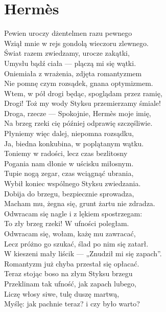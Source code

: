 \documentclass[12pt, a4paper]{memoir}
\renewenvironment{verse}{%
  \par\vspace{\baselineskip}\raggedright
}{
  \par\vspace{\baselineskip}
}
\begin{document}
\newpage
\section{Hermès}
\begin{verse}
Pewien uroczy dżentelmen razu pewnego\\
Wziął mnie w rejs gondolą wieczoru zlewnego.\\
Świat razem zwiedzamy, urocze zakątki,\\
Umysłu bądź ciała --- plączą mi się wątki.\\[\baselineskip]

Oniemiała z wrażenia, zdjęta romantyzmem\\
Nie pomnę czym rozsądek, gnana optymizmem.\\
Wtem, w pół drogi będąc, spoglądam przez ramię,\\
Drogi! Toż my wody Styksu przemierzamy śmiale!\\[\baselineskip]

Droga, rzecze --- Spokojnie, Hermès moje imię,\\
Na brzeg rzeki cię później odprawię szczęśliwie.\\
Płyniemy więc dalej, niepomna rozsądku,\\
Ja, biedna konkubina, w poplątanym wątku.\\[\baselineskip]

Toniemy w radości, lecz czas bezlitosny\\
Pogania nam dłonie w uścisku miłosnym.\\
Tupie nogą zegar, czas wciągnąć ubrania,\\
Wybił koniec wspólnego Styksu zwiedzania.\\[\baselineskip]

Dobija do brzegu, bezpiecznie sprowadza,\\
Macham mu, żegna się, grunt żartu nie zdradza.\\
Odwracam się nagle i z lękiem spostrzegam:\\
To zły brzeg rzeki! W ufności poległam.\\[\baselineskip]

Odwracam się, wołam, każę mu zawracać,\\
Lecz próżno go szukać, ślad po nim się zatarł.\\
W kieszeni mały liścik --- „Znudził mi się zapach”.\\
Romantyzm już chyba przestał się opłacać.\\[\baselineskip]

Teraz stojąc boso na złym Styksu brzegu\\
Przeklinam tak ufność, jak zapach lubego,\\
Liczę włosy siwe, tulę duszę martwą,\\
Myślę: jak pachnie teraz? i czy było warto?
\end{verse}
\end{document}
